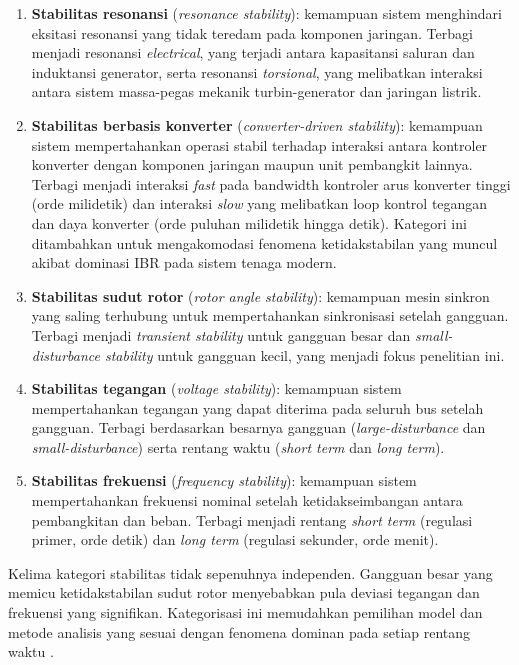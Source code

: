\begin{enumerate}
  \item \textbf{Stabilitas resonansi} (\textit{resonance stability}): kemampuan sistem
    menghindari eksitasi resonansi yang tidak teredam pada komponen jaringan. Terbagi
    menjadi resonansi \textit{electrical}, yang terjadi antara kapasitansi saluran dan
    induktansi generator, serta resonansi \textit{torsional}, yang melibatkan interaksi
    antara sistem massa-pegas mekanik turbin-generator dan jaringan listrik.
  \item \textbf{Stabilitas berbasis konverter} (\textit{converter-driven stability}):
    kemampuan sistem mempertahankan operasi stabil terhadap interaksi antara kontroler
    konverter dengan komponen jaringan maupun unit pembangkit lainnya. Terbagi menjadi
    interaksi \textit{fast} pada bandwidth kontroler arus konverter tinggi (orde
    milidetik) dan interaksi \textit{slow} yang melibatkan loop kontrol tegangan dan
    daya konverter (orde puluhan milidetik hingga detik). Kategori ini ditambahkan
    untuk mengakomodasi fenomena ketidakstabilan yang muncul akibat dominasi IBR pada
    sistem tenaga modern.
  \item \textbf{Stabilitas sudut rotor} (\textit{rotor angle stability}): kemampuan
    mesin sinkron yang saling terhubung untuk mempertahankan sinkronisasi setelah
    gangguan. Terbagi menjadi \textit{transient stability} untuk gangguan besar dan
    \textit{small-disturbance stability} untuk gangguan kecil, yang menjadi fokus
    penelitian ini.
  \item \textbf{Stabilitas tegangan} (\textit{voltage stability}): kemampuan sistem
    mempertahankan tegangan yang dapat diterima pada seluruh bus setelah gangguan.
    Terbagi berdasarkan besarnya gangguan (\textit{large-disturbance} dan
    \textit{small-disturbance}) serta rentang waktu (\textit{short term} dan
    \textit{long term}).
  \item \textbf{Stabilitas frekuensi} (\textit{frequency stability}): kemampuan sistem
    mempertahankan frekuensi nominal setelah ketidakseimbangan antara pembangkitan dan
    beban. Terbagi menjadi rentang \textit{short term} (regulasi primer, orde detik)
    dan \textit{long term} (regulasi sekunder, orde menit).
\end{enumerate}

Kelima kategori stabilitas tidak sepenuhnya independen. Gangguan besar yang memicu
ketidakstabilan sudut rotor menyebabkan pula deviasi tegangan dan frekuensi yang
signifikan. Kategorisasi ini memudahkan pemilihan model dan metode analisis yang sesuai
dengan fenomena dominan pada setiap rentang waktu \cite{kundur1994power}.

